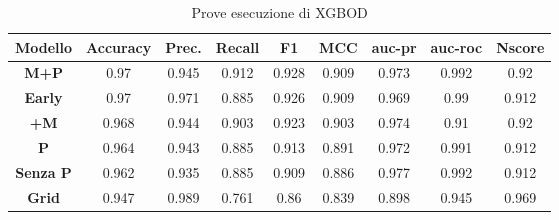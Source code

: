 \begin{table}[h]
    \centering
    \begin{tabular}{|c|c|c|c|c|c|c|c|c|}
    \hline
 \textbf{Modello} & \textbf{Accuracy} &\textbf{Prec.}  & \textbf{Recall} & \textbf{F1} & \textbf{MCC} & \textbf{auc-pr} & \textbf{auc-roc} & \textbf{Nscore}\\
 \hline
        \textbf{M+P} & 0.97 & 0.945 & 0.912 &0.928  & 0.909 & 0.973 & 0.992 &0.92 \\
        \hline
         \textbf{Early}& 0.97 & 0.971 & 0.885 & 0.926 & 0.909 & 0.969 & 0.99 & 0.912 \\
         \hline
         \textbf{+M}& 0.968 & 0.944 & 0.903 & 0.923 & 0.903 & 0.974 & 0.91 & 0.92 \\
         \hline
         \textbf{P}& 0.964 & 0.943 & 0.885 & 0.913 & 0.891 & 0.972 & 0.991 & 0.912 \\
         \hline
         \textbf{Senza P}& 0.962 & 0.935 & 0.885 & 0.909 & 0.886 & 0.977 & 0.992 & 0.912 \\
         \hline
         \textbf{Grid}& 0.947 & 0.989 & 0.761 & 0.86 & 0.839 & 0.898 & 0.945 & 0.969 \\
         \hline
    \end{tabular}
    \label{tab:XGBOD_table}
    \caption{Prove esecuzione di XGBOD}
\end{table}